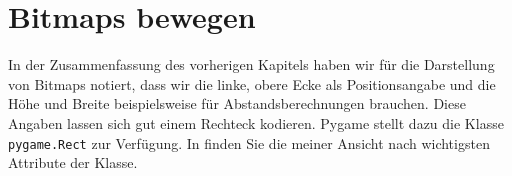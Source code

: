 \section{Bitmaps bewegen}
In der Zusammenfassung des vorherigen Kapitels haben wir für die Darstellung von Bitmaps notiert, dass wir die linke, obere Ecke als Positionsangabe und die Höhe und Breite beispielsweise für Abstandsberechnungen brauchen. Diese Angaben lassen sich gut einem Rechteck kodieren. Pygame stellt dazu die Klasse \texttt{pygame.Rect} zur Verfügung. In  finden Sie die meiner Ansicht nach wichtigsten Attribute der Klasse.

